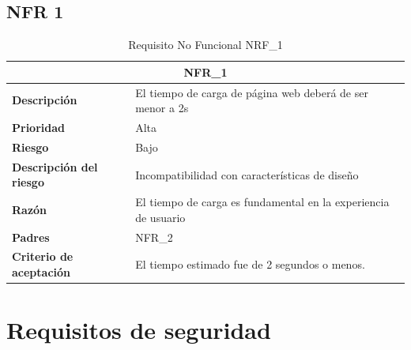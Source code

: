 \documentclass{scrreprt}
\begin{document}
\subsection{NFR 1}
\begin{table}[H]
    \label{tab:my-table}
    \begin{tabular}{|p{5cm}|p{11cm}|}
    \hline
    \multicolumn{2}{|c|}{\textbf{NFR_1}} \\
    \hline
    \textbf{Descripción  }                      &  El tiempo de carga de página web deberá de ser menor a 2s                                 \\ \hline
    \textbf{Prioridad}                          & Alta                                                                                             \\ \hline
    \textbf{Riesgo}                          & Bajo                                                                                               \\ \hline
    \textbf{Descripción del riesgo}                    & Incompatibilidad con características de diseño                                 \\ \hline
    \textbf{Razón}                   & El tiempo de carga es fundamental en la experiencia de usuario                                                                                \\ \hline
    \textbf{Padres}                               &  NFR_2\\  \hline
     \textbf{Criterio de aceptación}                    & El tiempo estimado fue de 2 segundos o menos.  \\ \hline
    \end{tabular}%
    
    \caption{Requisito No Funcional NRF_1}
\end{table}

\section{Requisitos de seguridad}
\end{document}
